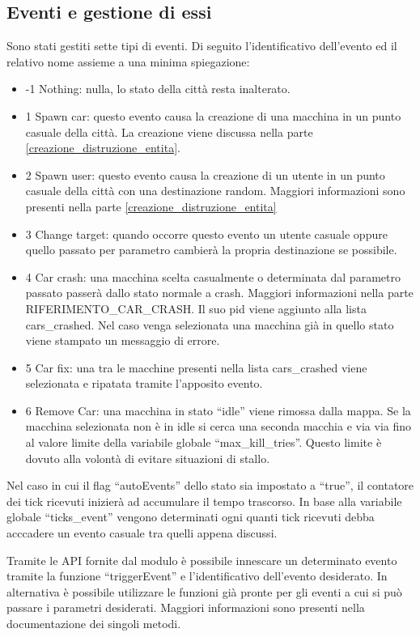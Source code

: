 \subsection{Eventi e gestione di essi}\label{env_events}
Sono stati gestiti sette tipi di eventi. Di seguito l'identificativo dell'evento ed il relativo nome assieme a una minima spiegazione:
\begin{itemize}
	\item -1 Nothing: nulla, lo stato della città resta inalterato.
	\item 1 Spawn car: questo evento causa la creazione di una macchina in un punto casuale della città. La creazione viene discussa nella parte \ref{creazione_distruzione_entita}.
	\item 2 Spawn user: questo evento causa la creazione di un utente in un punto casuale della città con una destinazione random. Maggiori informazioni sono presenti nella parte \ref{creazione_distruzione_entita}
	\item 3 Change target: quando occorre questo evento un utente casuale oppure quello passato per parametro cambierà la propria destinazione se possibile.
	\item 4 Car crash: una macchina scelta casualmente o determinata dal parametro passato passerà dallo stato normale a crash. Maggiori informazioni nella parte RIFERIMENTO\_CAR\_CRASH. Il suo pid viene aggiunto alla lista cars\_crashed. Nel caso venga selezionata una macchina già in quello stato viene stampato un messaggio di errore.
	\item 5 Car fix: una tra le macchine presenti nella lista cars\_crashed viene selezionata e ripatata tramite l'apposito evento. 
	\item 6 Remove Car: una macchina in stato ``idle'' viene rimossa dalla mappa. Se la macchina selezionata non è in idle si cerca una seconda macchia e via via fino al valore limite della variabile globale ``max\_kill\_tries''. Questo limite è dovuto alla volontà di evitare situazioni di stallo.
\end{itemize}

Nel caso in cui il flag ``autoEvents'' dello stato sia impostato a ``true'', il contatore dei tick ricevuti inizierà ad accumulare il tempo trascorso. In base alla variabile globale ``ticks\_event'' vengono determinati ogni quanti tick ricevuti debba acccadere un evento casuale tra quelli appena discussi.

Tramite le API fornite dal modulo è possibile innescare un determinato evento tramite la funzione ``triggerEvent'' e l'identificativo dell'evento desiderato. In alternativa è possibile utilizzare le funzioni già pronte per gli eventi a cui si può passare i parametri desiderati. Maggiori informazioni sono presenti nella documentazione dei singoli metodi.

